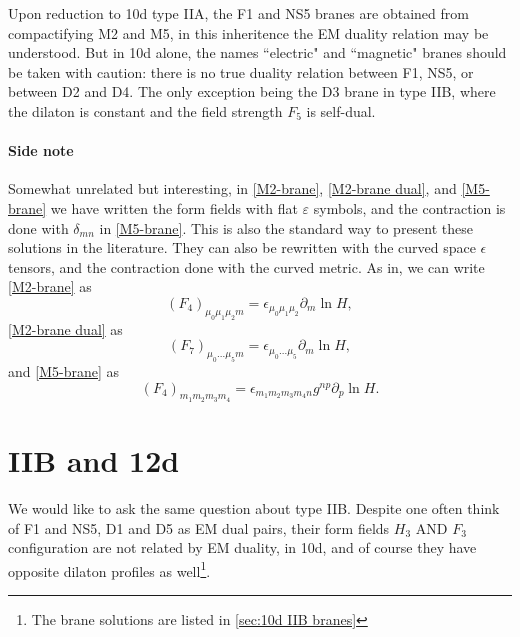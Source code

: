 Upon reduction to 10d type IIA, the F1 and NS5 branes are obtained from compactifying M2 and M5, in this inheritence the EM duality relation may be understood.
But in 10d alone, the names ``electric" and ``magnetic" branes should be taken with caution: there is no true duality relation between F1, NS5, or between D2 and D4. The only exception being the D3 brane in type IIB, where the dilaton is constant and the field strength $F_5$ is self-dual.

\paragraph{Side note}
Somewhat unrelated but interesting, in \eqref{M2-brane}, \eqref{M2-brane dual}, and \eqref{M5-brane} we have written the form fields with flat $\varepsilon$ symbols, and the contraction is done with $\delta_{mn}$ in \eqref{M5-brane}.
This is also the standard way to present these solutions in the literature.
They can also be rewritten with the curved space $\epsilon$ tensors, and the contraction done with the curved metric.
As in, we can write \eqref{M2-brane} as
\begin{equation}
(F_4)_{\mu_0 \mu_1 \mu_2 m} = \epsilon_{\mu_0 \mu_1 \mu_2}\partial_m \ln H,
\end{equation}
\eqref{M2-brane dual} as
\begin{equation}
(F_7)_{\mu_0 ... \mu_5 m} = \epsilon_{\mu_0 ... \mu_5}\partial_m \ln H,
\end{equation}
and \eqref{M5-brane} as
\begin{equation}
(F_4)_{m_1 m_2 m_3 m_4} = \epsilon_{m_1 m_2 m_3 m_4 n}g^{np} \partial_p \ln H.
\end{equation}


\section{IIB and 12d}

We would like to ask the same question about type IIB.
Despite one often think of F1 and NS5, D1 and D5 as EM dual pairs, their form fields $H_3$ AND $F_3$ configuration are not related by EM duality, in 10d, and of course they have opposite dilaton profiles as well\footnote{The brane solutions are listed in \ref{sec:10d IIB branes}}.

